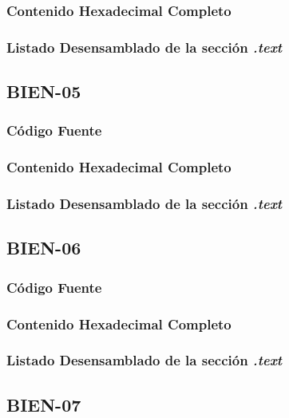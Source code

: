 \documentclass[a4paper,12pt]{article}
\begin{document}
\subsubsection{Contenido Hexadecimal Completo}
\subsubsection{Listado Desensamblado de la sección \textit{.text}}


\subsection{BIEN-05}
\subsubsection{Código Fuente}

\subsubsection{Contenido Hexadecimal Completo}
\subsubsection{Listado Desensamblado de la sección \textit{.text}}


\subsection{BIEN-06}
\subsubsection{Código Fuente}

\subsubsection{Contenido Hexadecimal Completo}
\subsubsection{Listado Desensamblado de la sección \textit{.text}}


\subsection{BIEN-07}
\end{document}
